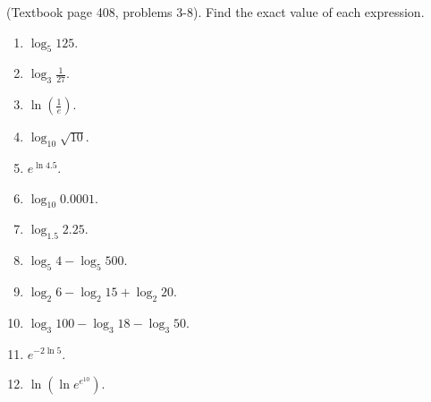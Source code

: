 
\begin{problem}(Textbook page 408, problems 3-8). Find the exact value of each expression.
\begin{multicols}{3}
\begin{enumerate}
\item $\log_5 125$. 

\item $\log_3 \frac{1}{27}$. 

\item $\ln \left(\frac{1}{e}\right) $. 

\item $\log_{10}\sqrt{10}$. 

\item $e^{\ln 4.5}$.  

\item $\log_{10} 0.0001 $.  

\item $\log_{1.5}2.25$.  

\item $\log_5 4- \log_5 500$.  

\item $\log_2 6 - \log_2 15 +\log_2 20$. 

\item $\log_3 100- \log_3 18 - \log _3 50 $.  

\item $e^{-2\ln 5}$.  

\item $\ln \left(\ln e^{e^{10}}\right)$. 

\end{enumerate}
\end{multicols}
\end{problem}